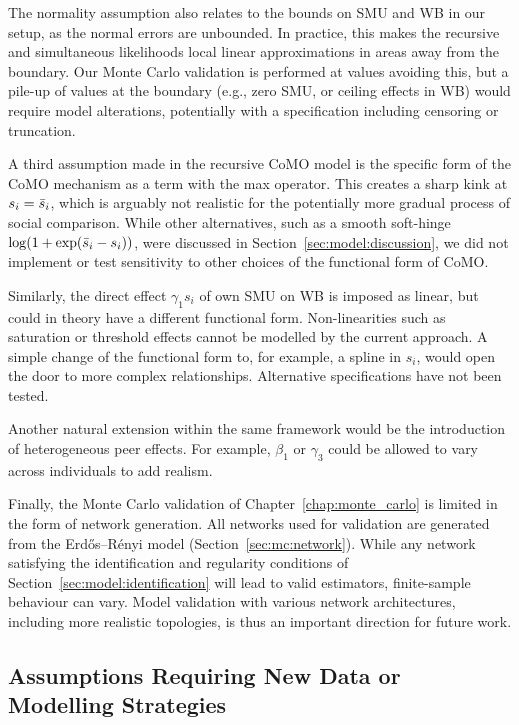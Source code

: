 The normality assumption also relates to the bounds on SMU and WB in our setup, as the normal errors are unbounded. In practice, this makes the recursive and simultaneous likelihoods local linear approximations in areas away from the boundary. Our Monte Carlo validation is performed at values avoiding this, but a pile-up of values at the boundary (e.g., zero SMU, or ceiling effects in WB) would require model alterations, potentially with a specification including censoring or truncation.

A third assumption made in the recursive CoMO model is the specific form of the CoMO mechanism as a term with the max operator. This creates a sharp kink at $s_i = \bar{s}_i$, which is arguably not realistic for the potentially more gradual process of social comparison. While other alternatives, such as a smooth soft-hinge $\log(1 + \exp(\bar{s}_i - s_i))$, were discussed in Section~\ref{sec:model:discussion}, we did not implement or test sensitivity to other choices of the functional form of CoMO\@.

Similarly, the direct effect $\gamma_1 s_i$ of own SMU on WB is imposed as linear, but could in theory have a different functional form. Non-linearities such as saturation or threshold effects cannot be modelled by the current approach. A simple change of the functional form to, for example, a spline in $s_i$, would open the door to more complex relationships. Alternative specifications have not been tested.

Another natural extension within the same framework would be the introduction of heterogeneous peer effects. For example, $\beta_1$ or $\gamma_3$ could be allowed to vary across individuals to add realism.

Finally, the Monte Carlo validation of Chapter~\ref{chap:monte_carlo} is limited in the form of network generation. All networks used for validation are generated from the Erd\H{o}s--R\'enyi model (Section~\ref{sec:mc:network}). While any network satisfying the identification and regularity conditions of Section~\ref{sec:model:identification} will lead to valid estimators, finite-sample behaviour can vary. Model validation with various network architectures, including more realistic topologies, is thus an important direction for future work.

\subsection{Assumptions Requiring New Data or Modelling Strategies}

